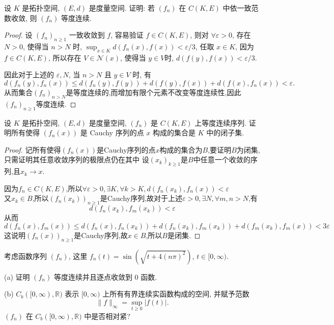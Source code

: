 




\begin{exercise}
    设 $K$ 是拓扑空间, $(E,d)$ 是度量空间. 证明: 
    若 $(f_{n})$ 在 $C(K, E)$ 中依一致范数收敛, 则 $(f_{n})$ 等度连续.
\end{exercise}

\begin{proof}
    设 $(f_n)_{n\geq 1}$ 一致收敛到 $f$, 容易验证 $f\in C(K,E)$,
    则对 $\forall\varepsilon>0$, 存在 $N>0$, 使得当 $n>N$ 时,
    $\sup_{x\in K}d(f_n(x),f(x))<\varepsilon/3$,
    任取 $x\in K$, 因为 $f\in C(K,E)$, 所以存在 $V\in\mathcal{N}(x)$,
    使得当 $y\in V$时, $d(f(y),f(x))<\varepsilon/3$.

    因此对于上述的 $\varepsilon,N$, 当 $n>N$ 且 $y\in V$ 时, 有
    \[d(f_n(y),f_n(x))\leq d(f_n(y),f(y))+d(f(y),f(x))+d(f(x),f_n(x))<\varepsilon.\]
    从而集合$(f_n)_{n>N}$是等度连续的,而增加有限个元素不改变等度连续性,因此$(f_n)_{n\geq 1}$等度连续.
\end{proof}



\begin{exercise}
    设 $K$ 是拓扑空间, $(E, d)$ 是度量空间, $(f_{n})$ 是 $C(K, E)$ 上等度连续序列. 
    证明所有使得 $(f_{n}(x))$ 是 Cauchy 序列的点 $x$ 构成的集合是 $K$ 中的闭子集.
\end{exercise}

\begin{proof}
记所有使得$(f_n(x))$是Cauchy序列的点$x$构成的集合为$B$,要证明$B$为闭集,只需证明其任意收敛序列的极限点仍在其中
设$(x_k)_{k\geq 1}$是$B$中任意一个收敛的序列,且$x_k\to x$.

因为$f_n\in C(K,E)$,所以$\forall\varepsilon>0,\exists K,\forall k>K,d(f_n(x_k),f_n(x))<\varepsilon$\\
又$x_k\in B$,所以$(f_n(x_k))_{n\geq 1}$是Cauchy序列,故对于上述$\varepsilon>0,\exists N,\forall m,n>N$,有
\[d(f_n(x_k),f_m(x_k))<\varepsilon\]
从而\[d(f_n(x),f_m(x))\leq d(f_n(x),f_n(x_k))+d(f_n(x_k),f_m(x_k))+d(f_m(x_k),f_m(x))<3\varepsilon\]
这说明$(f_n(x))_{n\geq 1}$是Cauchy序列,故$x\in B$,所以$B$是闭集.
\end{proof}



\begin{exercise}
    考虑函数序列 $(f_{n})$, 这里 $f_{n}(t)=\sin\left(\sqrt{t+4(n\pi)^2}\right)$, $t\in[0,\infty)$.

    (a) 证明 $(f_{n})$ 等度连续并且逐点收敛到 $0$ 函数.

    (b) $C_{b}([0,\infty),\mathbb{R})$ 表示 $[0, \infty)$ 上所有有界连续实函数构成的空间, 并赋予范数
    \[\|f\|_{\infty}=\sup_{t\geq 0}|f(t)|.\]
    $(f_n)$ 在 $C_b([0,\infty),\mathbb{R})$ 中是否相对紧?
\end{exercise}

